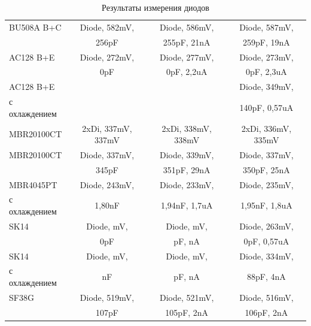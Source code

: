 \begin{table}[H]
\begin{center}
\begin{tabular}{| l | c | c | c |}
    \hline
BU508A B+C & Diode, 582mV,        & Diode, 586mV,             & Diode, 587mV,            \\
           &               256pF  &               255pF, 21nA &               259pF, 19nA\\
    \hline
AC128 B+E  & Diode, 272mV,        & Diode, 277mV,              & Diode, 273mV,             \\
           &               0pF    &               0pF, 2,2uA   &               0pF, 2,3uA  \\
    \hline
AC128 B+E  &                      &                     & Diode, 349mV,               \\
с охлаждением     &                      &                     &               140pF, 0,57uA \\
    \hline
MBR20100CT & 2xDi, 337mV, 337mV   & 2xDi, 338mV, 338mV  & 2xDi, 336mV, 335mV  \\
    \hline
MBR20100CT & Diode, 337mV,        & Diode, 339mV,             & Diode, 337mV,            \\
           &               345pF  &               351pF, 29nA &               350pF, 25nA\\
    \hline
MBR4045PT  & Diode, 243mV,        & Diode, 233mV,               & Diode, 235mV,              \\
с охлаждением     &               1,80nF &               1,94nF, 1,7uA &               1,95nF, 1,8uA\\
    \hline
SK14       & Diode,    mV,        & Diode,    mV,               & Diode, 263mV,              \\
           &                  0pF &                   pF,    nA &               0pF, 0,57uA\\
    \hline
SK14       & Diode,    mV,        & Diode,    mV,               & Diode, 334mV,              \\
с охлаждением     &                   nF &                   pF,    nA &               88pF, 4nA\\
    \hline
SF38G      & Diode, 519mV,        & Diode, 521mV,            & Diode, 516mV,            \\
           &               107pF  &               105pF, 2nA &               106pF, 2nA \\
    \hline
    \end{tabular}
  \end{center}
  \caption{Результаты измерения диодов}
  \label{tab:diodes} 
\end{table}


